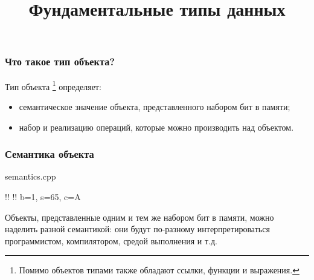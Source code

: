 \documentclass[compress, 8pt]{beamer}
\title{Фундаментальные типы данных}
\begin{document}
\frame[plain]{\titlepage}

\begin{frame}

    \frametitle{Что такое тип объекта?}

    Тип объекта
    \footnote{Помимо объектов типами также обладают
    ссылки, функции и выражения.}
    определяет:

    \begin{itemize}

        \item семантическое значение объекта, представленного
            набором бит в памяти;

        \item набор и реализацию операций, которые можно производить
            над объектом.

    \end{itemize}

\end{frame}

\begin{frame}[fragile]

    \frametitle{Семантика объекта}

        {semantics.cpp}

    \begin{terminalwindow}
!!
!!
b=1, s=65, c=A
    \end{terminalwindow}

    Объекты, представленные одним и тем же набором бит в памяти, можно
    наделить разной семантикой: они будут по-разному интерпретироваться
    программистом, компилятором, средой выполнения и т.д.

\end{frame}
\end{document}

